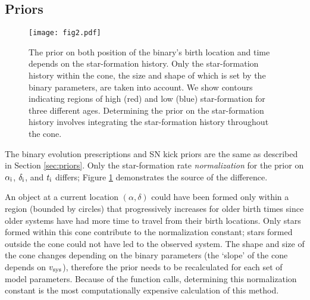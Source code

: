 \documentclass[usenatbib]{mnras}
\begin{document}
\subsection{Priors} \label{sec:priors_indiv}


\begin{figure}
\begin{center}
\texttt{[image: fig2.pdf]}
\caption{The prior on both position of the binary's birth location and time depends on the star-formation history. Only the star-formation history within the cone, the size and shape of which is set by the binary parameters, are taken into account. We show contours indicating regions of high (red) and low (blue) star-formation for three different ages. Determining the prior on the star-formation history involves integrating the star-formation history throughout the cone.}
\label{fig:prior_SFH}
\end{center}
\end{figure}


The binary evolution prescriptions and SN kick priors are the same as described in Section \ref{sec:priors}. Only the star-formation rate {\it normalization} for the prior on $\alpha_{\rm i}$, $\delta_{\rm i}$, and $t_{\rm i}$ differs; Figure \ref{fig:prior_SFH} demonstrates the source of the difference.


An object at a current location $(\alpha, \delta)$ could have been formed only within a region (bounded by circles) that progressively increases for older birth times since older systems have had more time to travel from their birth locations. Only stars formed within this cone contribute to the normalization constant; stars formed outside the cone could not have led to the observed system. The shape and size of the cone changes depending on the binary parameters (the `slope' of the cone depends on $v_{\rm sys}$), therefore the prior needs to be recalculated for each set of model parameters. Because of the function calls, determining this normalization constant is the most computationally expensive calculation of this method. 
\end{document}

